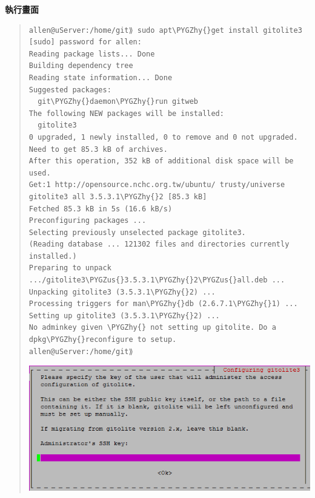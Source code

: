 \documentclass[letterpaper,10pt,english]{sphinxmanual}
\def\PYGZus{\char`\_}
\def\PYGZhy{\char`\-}
\begin{document}
\textbf{執行畫面}
\begin{quote}

\begin{Verbatim}[commandchars=\\\{\}]
allen@uServer:/home/git⟫ sudo apt\PYGZhy{}get install gitolite3
[sudo] password for allen:
Reading package lists... Done
Building dependency tree
Reading state information... Done
Suggested packages:
  git\PYGZhy{}daemon\PYGZhy{}run gitweb
The following NEW packages will be installed:
  gitolite3
0 upgraded, 1 newly installed, 0 to remove and 0 not upgraded.
Need to get 85.3 kB of archives.
After this operation, 352 kB of additional disk space will be used.
Get:1 http://opensource.nchc.org.tw/ubuntu/ trusty/universe gitolite3 all 3.5.3.1\PYGZhy{}2 [85.3 kB]
Fetched 85.3 kB in 5s (16.6 kB/s)
Preconfiguring packages ...
Selecting previously unselected package gitolite3.
(Reading database ... 121302 files and directories currently installed.)
Preparing to unpack .../gitolite3\PYGZus{}3.5.3.1\PYGZhy{}2\PYGZus{}all.deb ...
Unpacking gitolite3 (3.5.3.1\PYGZhy{}2) ...
Processing triggers for man\PYGZhy{}db (2.6.7.1\PYGZhy{}1) ...
Setting up gitolite3 (3.5.3.1\PYGZhy{}2) ...
No adminkey given \PYGZhy{} not setting up gitolite. Do a dpkg\PYGZhy{}reconfigure to setup.
allen@uServer:/home/git⟫
\end{Verbatim}

\includegraphics{gitolite3-configureing.png}
\end{quote}
\end{document}
